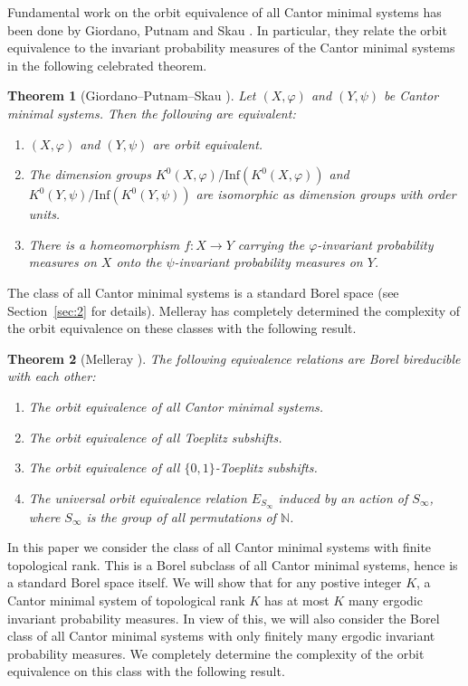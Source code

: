 \documentclass{amsart}
\newtheorem{theorem}{Theorem}[section]
\theoremstyle{definition}
\theoremstyle{problem}
\theoremstyle{remark}
\numberwithin{equation}{section}
\begin{document}
Fundamental work on the orbit equivalence of all Cantor minimal systems has been done by Giordano, Putnam and Skau \cite{GPS}. In particular, they relate the orbit equivalence to the invariant probability measures of the Cantor minimal systems in the following celebrated theorem.

\begin{theorem} [Giordano--Putnam--Skau {\cite[Theorem 2.2]{GPS}}]\label{thm:GPS} Let $(X, \varphi)$ and $(Y, \psi)$ be Cantor minimal systems. Then the following are equivalent:
\begin{enumerate}
\item[\rm (1)] $(X, \varphi)$ and $(Y, \psi)$ are orbit equivalent.
\item[\rm (2)] The dimension groups $K^0(X, \varphi)/\mbox{Inf}(K^0(X, \varphi))$ and $K^0(Y,\psi)/\mbox{Inf}(K^0(Y,\psi))$ are isomorphic as dimension groups with order units.
\item[\rm (3)] There is a homeomorphism $f\colon X\to Y$ carrying the $\varphi$-invariant probability measures on $X$ onto the $\psi$-invariant probability measures on $Y$.
\end{enumerate}
\end{theorem}

The class of all Cantor minimal systems is a standard Borel space (see Section~\ref{sec:2} for details). Melleray \cite{Melleray} has completely determined the complexity of the orbit equivalence on these classes with the following result.

\begin{theorem} [Melleray {\cite[Theorem 5.9]{Melleray}}]\label{thm:Melleray} The following equivalence relations are Borel bireducible with each other:
\begin{enumerate}
\item[\rm (i)] The orbit equivalence of all Cantor minimal systems.
\item[\rm (ii)] The orbit equivalence of all Toeplitz subshifts.
\item[\rm (iii)] The orbit equivalence of all $\{0,1\}$-Toeplitz subshifts.
\item[\rm (iv)] The universal orbit equivalence relation $E_{S_\infty}$ induced by an action of $S_\infty$, where $S_\infty$ is the group of all permutations of $\mathbb{N}$.
\end{enumerate}
\end{theorem}

 In this paper we consider the class of all Cantor minimal systems with finite topological rank. This is a Borel subclass of all Cantor minimal systems, hence is a standard Borel space itself. We will show that for any postive integer $K$, a Cantor minimal system of topological rank $K$ has at most $K$ many ergodic invariant probability measures. In view of this, we will also consider the Borel class of all Cantor minimal systems with only finitely many ergodic invariant probability measures. We completely determine the complexity of the orbit equivalence on this class with the following result.
\end{document}
